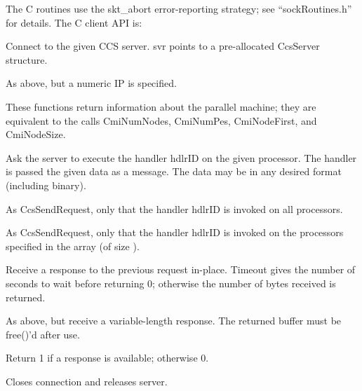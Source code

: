 The C routines use the skt\_abort error-reporting strategy;
see ``sockRoutines.h'' for details.  The C client API is:

Connect to the given CCS server.  svr points to a pre-allocated
CcsServer structure.

As above, but a numeric IP is specified.

These functions return information about the parallel machine;
they are equivalent to the \converse{} calls CmiNumNodes,
CmiNumPes, CmiNodeFirst, and CmiNodeSize.

Ask the server to execute the handler hdlrID on the given processor.
The handler is passed the given data as a message.  The data may
be in any desired format (including binary). 

As CcsSendRequest, only that the handler hdlrID is invoked on all processors.

As CcsSendRequest, only that the handler hdlrID is invoked on the processors
specified in the array  (of size ).

Receive a response to the previous request in-place.
Timeout gives the number of seconds to wait before returning 0;
otherwise the number of bytes received is returned. 

As above, but receive a variable-length response.  The
returned buffer must be free()'d after use.

Return 1 if a response is available; otherwise 0.

Closes connection and releases server.


